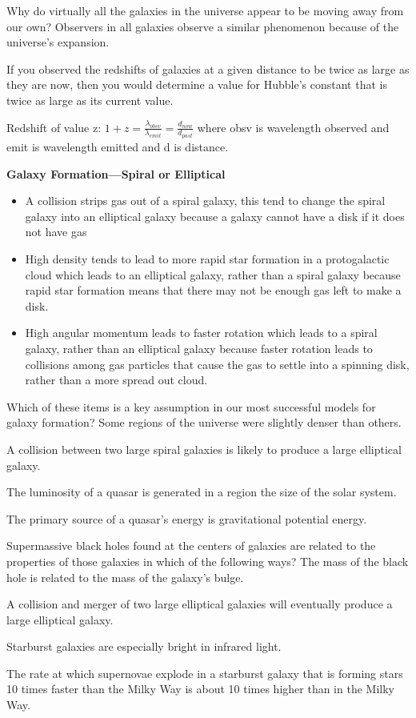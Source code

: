 Why do virtually all the galaxies in the universe appear to be moving away from our own? Observers in all galaxies observe a similar phenomenon because of the universe's expansion.

If you observed the redshifts of galaxies at a given distance to be twice as large as they are now, then you would determine a value for Hubble's constant that is twice as large as its current value.

Redshift of value z: $1+z=\frac{\lambda_{obsv}}{\lambda_{emit}} = \frac{d_{now}}{d_{past}}$ where obsv is wavelength observed and emit is wavelength emitted and d is distance.

\textbf{Galaxy Formation—Spiral or Elliptical}
\begin{itemize}
    \item A collision strips gas out of a spiral galaxy, this tend to change the spiral galaxy into an elliptical galaxy because a galaxy cannot have a disk if it does not have gas
    \item High density tends to lead to more rapid star formation in a protogalactic cloud which leads to an elliptical galaxy, rather than a spiral galaxy because rapid star formation means that there may not be enough gas left to make a disk.
    \item High angular momentum leads to faster rotation which leads to a spiral galaxy, rather than an elliptical galaxy because faster rotation leads to collisions among gas particles that cause the gas to settle into a spinning disk, rather than a more spread out cloud.
\end{itemize}

Which of these items is a key assumption in our most successful models for galaxy formation? Some regions of the universe were slightly denser than others.

A collision between two large spiral galaxies is likely to produce a large elliptical galaxy.

The luminosity of a quasar is generated in a region the size of the solar system.

The primary source of a quasar's energy is gravitational potential energy.

Supermassive black holes found at the centers of galaxies are related to the properties of those galaxies in which of the following ways? The mass of the black hole is related to the mass of the galaxy’s bulge.

A collision and merger of two large elliptical galaxies will eventually produce a large elliptical galaxy.

Starburst galaxies are especially bright in infrared light.

The rate at which supernovae explode in a starburst galaxy that is forming stars 10 times faster than the Milky Way is about 10 times higher than in the Milky Way.



